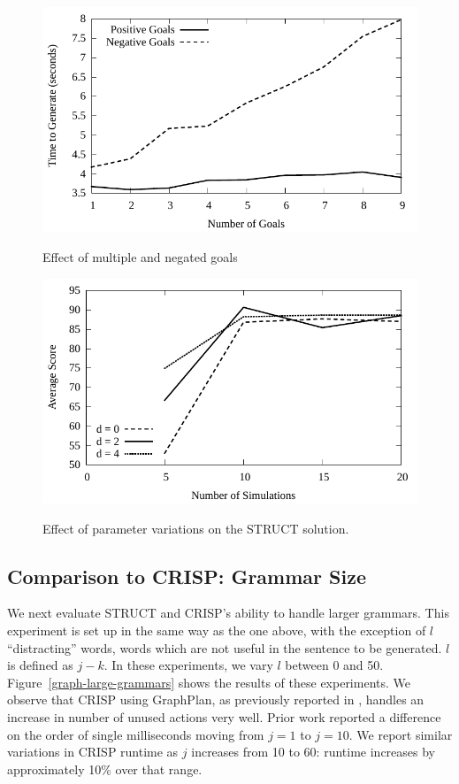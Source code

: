 \begin{figure}
\includegraphics[width=0.7 \linewidth]{../analysis/plots/goals/differentgoals.pdf}
\label{chart-different-goals}
\caption{Effect of multiple and negated goals}
\end{figure}

\begin{figure}
\includegraphics[width=0.7 \linewidth]{../analysis/plots/params/pltag-n-v-score.pdf}
\label{chart-n-v-score}
\caption{Effect of parameter variations on the STRUCT solution.}
\end{figure}


\subsection{Comparison to CRISP:  Grammar Size}
We next evaluate STRUCT and CRISP's ability to
handle larger grammars. This experiment is set up in the same way as
the one above, with the exception of $l$ ``distracting'' words, words
which are not useful in the sentence to be generated.  $l$ is defined
as $j - k$.  In these experiments, we vary $l$ between 0 and 50.
Figure~\ref{graph-large-grammars} shows the results of these
experiments.  We observe that CRISP using GraphPlan, as previously
reported in \cite{koller_experiences_2011}, handles an increase in
number of unused actions very well.  Prior work reported a difference
on the order of single milliseconds moving from $j = 1$ to $j = 10$.
We report similar variations in CRISP runtime as $j$ increases from 10
to 60: runtime increases by approximately 10\% over that range.

